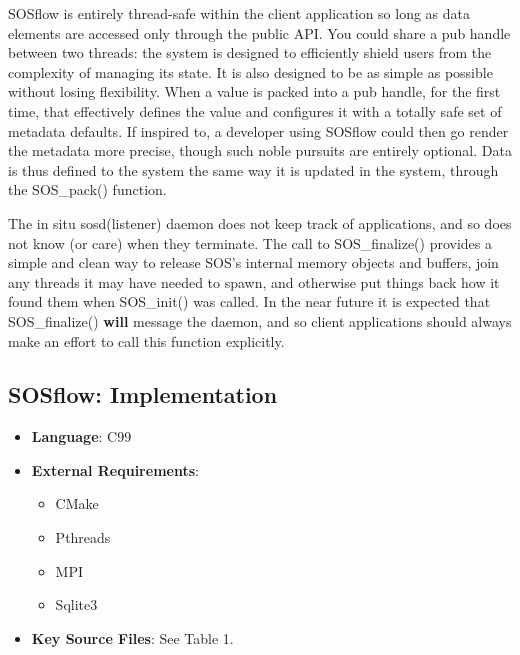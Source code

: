 SOSflow is entirely thread-safe within the client application so long
as data elements are accessed only through the public API.
%
You could share a pub handle between two threads: the system is
designed to efficiently shield users from the complexity of managing
its state.
%
It is also designed to be as simple as possible without losing
flexibility.
%
When a value is packed into a pub handle, for the first time, that
effectively defines the value and configures it with a totally safe
set of metadata defaults.
%
If inspired to, a developer using SOSflow could then go render the
metadata more precise, though such noble pursuits are entirely
optional.
%
Data is thus defined to the system the same way it is updated in the
system, through the SOS\_pack() function.

The in situ sosd(listener) daemon does not keep track of applications,
and so does not know (or care) when they terminate.
%
The call to SOS\_finalize() provides a simple and clean way to release
SOS's internal memory objects and buffers, join any threads it may
have needed to spawn, and otherwise put things back how it found them
when SOS\_init() was called.
%
In the near future it is expected that SOS\_finalize() \textbf{will}
message the daemon, and so client applications should always make an
effort to call this function explicitly.

\subsection{SOSflow: Implementation}
%
\begin{itemize}
    \item \textbf{Language}: C99
    \item \textbf{External Requirements}:
      \begin{itemize}
          \item CMake
          \item Pthreads
          \item MPI
          \item Sqlite3
      \end{itemize}
  \item \textbf{Key Source Files}: See Table 1.
\end{itemize}

